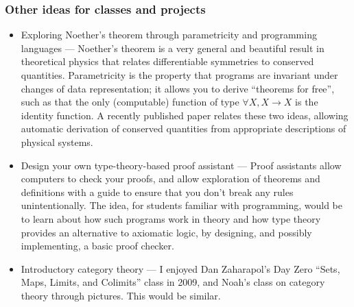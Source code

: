 \documentclass{article}
\begin{document}
\subsubsection*{Other ideas for classes and projects}
\begin{itemize}
  \item
    Exploring Noether's theorem through parametricity and programming languages --- Noether's theorem is a very general and beautiful result in theoretical physics that relates differentiable symmetries to conserved quantities.  Parametricity is the property that programs are invariant under changes of data representation; it allows you to derive ``theorems for free'', such as that the only (computable) function of type $\forall X, X \to X$ is the identity function.  A recently published paper%
    relates these two ideas, allowing automatic derivation of conserved quantities from appropriate descriptions of physical systems.  %
  \item Design your own type-theory-based proof assistant --- Proof assistants allow computers to check your proofs, and allow exploration of theorems and definitions with a guide to ensure that you don't break any rules unintentionally.  %
  The idea, for students familiar with programming, would be to learn about how such programs work in theory and how type theory provides an alternative to axiomatic logic, by designing, and possibly implementing, a basic proof checker.
  \item Introductory category theory --- I enjoyed Dan Zaharapol's Day Zero ``Sets, Maps, Limits, and Colimits'' class in 2009, and Noah's class on category theory through pictures.  This would be similar.

\end{itemize}
\end{document}
